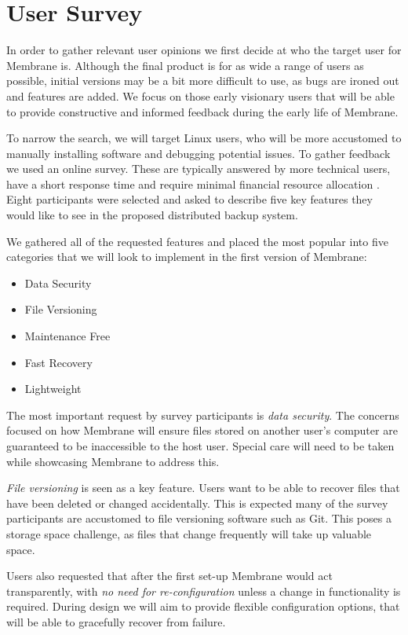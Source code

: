 \documentclass[a4paper, 11pt, twocolumn, twoside]{report}
\begin{document}
\section{User Survey}

In order to gather relevant user opinions we first decide at who the target user for Membrane is. Although the final product is for as wide a range of users as possible, initial versions may be a bit more difficult to use, as bugs are ironed out and features are added. We focus on those early visionary users that will be able to provide constructive and informed feedback during the early life of Membrane.

To narrow the search, we will target Linux users, who will be more accustomed to manually installing software and debugging potential issues. To gather feedback we used an online survey. These are typically answered by more technical users, have a short response time and require minimal financial resource allocation \citep{ilieva2002online}. Eight participants were selected and asked to describe five key features they would like to see in the proposed distributed backup system.

We gathered all of the requested features and placed the most popular into five categories that we will look to implement in the first version of Membrane:

\begin{itemize}
 \item Data Security
 \item File Versioning
 \item Maintenance Free
 \item Fast Recovery
 \item Lightweight
\end{itemize}

The most important request by survey participants is \emph{data security}. The concerns focused on how Membrane will ensure files stored on another user's computer are guaranteed to be inaccessible to the host user. Special care will need to be taken while showcasing Membrane to address this.

\emph{File versioning} is seen as a key feature. Users want to be able to recover files that have been deleted or changed accidentally. This is expected many of the survey participants are accustomed to file versioning software such as Git. This poses a storage space challenge, as files that change frequently will take up valuable space.

Users also requested that after the first set-up Membrane would act transparently, with \emph{no need for re-configuration} unless a change in functionality is required. During design we will aim to provide flexible configuration options, that will be able to gracefully recover from failure.
\end{document}
